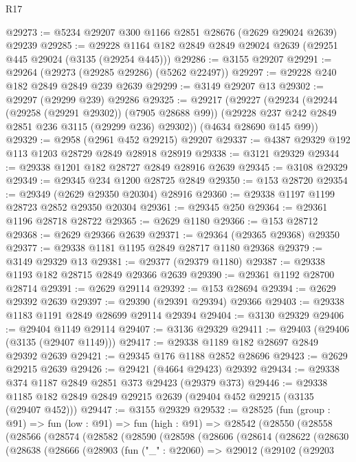 \begin{lexlean}{R17}
\begin{coremodule}
@29273 := @5234 @29207 @300 @1166 @2851 @28676 (@2629 @29024 @2639) @29239
@29285 := @29228 @1164 @182 @2849 @2849 @29024 @2639 (@29251 @445 @29024 (@3135 (@29254 @445)))
@29286 := @3155 @29207
@29291 := @29264 (@29273 (@29285 @29286) (@5262 @22497))
@29297 := @29228 @240 @182 @2849 @2849 @239 @2639
@29299 := @3149 @29207 @13
@29302 := @29297 (@29299 @239) @29286
@29325 := @29217
    (@29227
      (@29234
        (@29244 (@29258 (@29291 @29302)) (@7905 @28688 @99))
        (@29228 @237 @242 @2849 @2851 @236 @3115 (@29299 @236) @29302))
      (@4634 @28690 @145 @99))
@29329 := @2958 (@2961 @452 @29215) @29207
@29337 := @4387 @29329 @192 @113 @1203 @28729 @2849 @28918 @28919
@29338 := @3121 @29329
@29344 := @29338 @1201 @182 @28727 @2849 @28916 @2639
@29345 := @3108 @29329
@29349 := @29345 @234 @1200 @28725 @2849
@29350 := @153 @28720
@29354 := @29349 (@2629 @29350 @20304) @28916
@29360 := @29338 @1197 @1199 @28723 @2852 @29350 @20304
@29361 := @29345 @250
@29364 := @29361 @1196 @28718 @28722
@29365 := @2629 @1180
@29366 := @153 @28712
@29368 := @2629 @29366 @2639
@29371 := @29364 (@29365 @29368) @29350
@29377 := @29338 @1181 @1195 @2849 @28717 @1180 @29368
@29379 := @3149 @29329 @13
@29381 := @29377 (@29379 @1180)
@29387 := @29338 @1193 @182 @28715 @2849 @29366 @2639
@29390 := @29361 @1192 @28700 @28714
@29391 := @2629 @29114
@29392 := @153 @28694
@29394 := @2629 @29392 @2639
@29397 := @29390 (@29391 @29394) @29366
@29403 := @29338 @1183 @1191 @2849 @28699 @29114 @29394
@29404 := @3130 @29329
@29406 := @29404 @1149 @29114
@29407 := @3136 @29329
@29411 := @29403 (@29406 (@3135 (@29407 @1149)))
@29417 := @29338 @1189 @182 @28697 @2849 @29392 @2639
@29421 := @29345 @176 @1188 @2852 @28696
@29423 := @2629 @29215 @2639
@29426 := @29421 (@4664 @29423) @29392
@29434 := @29338 @374 @1187 @2849 @2851 @373 @29423 (@29379 @373)
@29446 := @29338 @1185 @182 @2849 @2849 @29215 @2639 (@29404 @452 @29215 (@3135 (@29407 @452)))
@29447 := @3155 @29329
@29532 := @28525
    (fun (group : @91) =>
    fun (low : @91) =>
    fun (high : @91) =>
    @28542
      (@28550
        (@28558
          (@28566
            (@28574
              (@28582
                (@28590
                  (@28598
                    (@28606
                      (@28614
                        (@28622
                          (@28630
                            (@28638
                              (@28666
                                (@28903
                                  (fun ("_" : @22060) =>
                                  @29012
                                    (@29102
                                      (@29203

\end{coremodule}
\end{lexlean}

